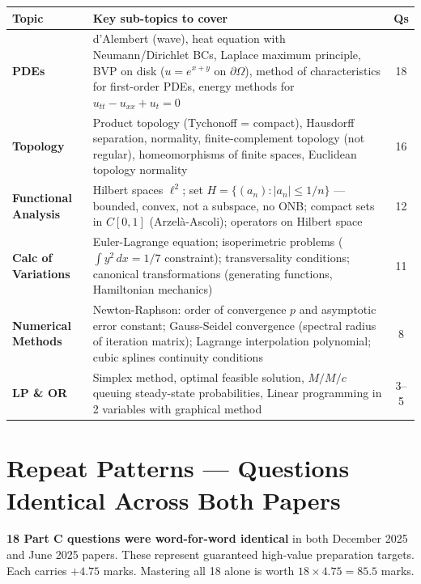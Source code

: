 \documentclass[12pt,a4paper]{article}
\begin{document}
\begin{center}
\renewcommand{\arraystretch}{1.35}
\begin{tabular}{@{}p{3.2cm}p{9.5cm}c@{}}
\toprule
\rowcolor{bluelight}
\textbf{Topic} & \textbf{Key sub-topics to cover} & \textbf{Qs} \\
\midrule
\textbf{PDEs} & d'Alembert (wave), heat equation with Neumann/Dirichlet BCs, Laplace maximum principle, BVP on disk ($u=e^{x+y}$ on $\partial\Omega$), method of characteristics for first-order PDEs, energy methods for $u_{tt}-u_{xx}+u_t=0$ & 18 \\
\addlinespace
\textbf{Topology} & Product topology (Tychonoff = compact), Hausdorff separation, normality, finite-complement topology (not regular), homeomorphisms of finite spaces, Euclidean topology normality & 16 \\
\addlinespace
\textbf{Functional Analysis} & Hilbert spaces $\ell^2$; set $H=\{(a_n):|a_n|\le 1/n\}$ — bounded, convex, not a subspace, no ONB; compact sets in $C[0,1]$ (Arzelà-Ascoli); operators on Hilbert space & 12 \\
\addlinespace
\textbf{Calc of Variations} & Euler-Lagrange equation; isoperimetric problems ($\int y^2\,dx=1/7$ constraint); transversality conditions; canonical transformations (generating functions, Hamiltonian mechanics) & 11 \\
\addlinespace
\textbf{Numerical Methods} & Newton-Raphson: order of convergence $p$ and asymptotic error constant; Gauss-Seidel convergence (spectral radius of iteration matrix); Lagrange interpolation polynomial; cubic splines continuity conditions & 8 \\
\addlinespace
\textbf{LP \& OR} & Simplex method, optimal feasible solution, $M/M/c$ queuing steady-state probabilities, Linear programming in 2 variables with graphical method & 3--5 \\
\bottomrule
\end{tabular}
\end{center}

\newpage

\section{Repeat Patterns — Questions Identical Across Both Papers}

\begin{alertred}
\small\textbf{18 Part C questions were word-for-word identical} in both December 2025 and June 2025 papers. These represent guaranteed high-value preparation targets. Each carries $+4.75$ marks. Mastering all 18 alone is worth $18\times4.75=\mathbf{85.5}$ marks.
\end{alertred}
\end{document}
